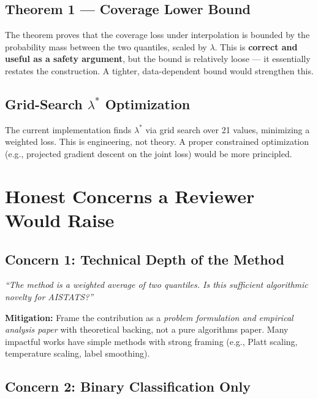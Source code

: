 \documentclass[11pt,a4paper]{article}
\begin{document}
\subsection{Theorem 1 --- Coverage Lower Bound}

The theorem proves that the coverage loss under interpolation is bounded by the probability mass between the two quantiles, scaled by $\lambda$. This is \textbf{correct and useful as a safety argument}, but the bound is relatively loose --- it essentially restates the construction. A tighter, data-dependent bound would strengthen this.

\subsection{Grid-Search $\lambda^*$ Optimization}

The current implementation finds $\lambda^*$ via grid search over 21 values, minimizing a weighted loss. This is engineering, not theory. A proper constrained optimization (e.g., projected gradient descent on the joint loss) would be more principled.

\section{Honest Concerns a Reviewer Would Raise}
\label{sec:concerns}

\subsection{Concern 1: Technical Depth of the Method}

\begin{cautionbox}
\emph{``The method is a weighted average of two quantiles. Is this sufficient algorithmic novelty for AISTATS?''}
\end{cautionbox}

\noindent\textbf{Mitigation:} Frame the contribution as a \emph{problem formulation and empirical analysis paper} with theoretical backing, not a pure algorithms paper. Many impactful works have simple methods with strong framing (e.g., Platt scaling, temperature scaling, label smoothing).

\subsection{Concern 2: Binary Classification Only}
\end{document}
